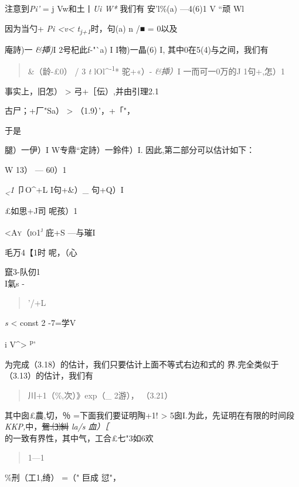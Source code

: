 \documentclass{article}
\begin{document}
注意到\emph{Pi'} = j Vw和土丨\emph{Ui W*} 我们有 安'{l\%(a) ---4(6)1} V
``顽 {Wl}

因为当勺+ \emph{Pi \textless{}v\textless{}
t\textsubscript{j+1}}时，句(a) n /■ = 0以及

庵詩)一 \emph{\&揷)}I 2号杞此f-"`a) I I物)一晶(6) I,
其中0在5(4)与之间，我们有

\begin{quote}
\textbar{}\&（龄-£0）\textbar{} / 3 \emph{t}
lOl\^{}\textsuperscript{-1}* 驼+«）- \emph{\&揷）}I
一而可一0万\textbar{}的J 1句+,怎）1
\end{quote}

事实上，旧怎）\textbar{} \textgreater{}
\textbar{}弓+［伝）\textbar{},并由引理2.1

\textbar{}古尸；+厂"Sa）\textbar{} \textgreater{} （1.9）'，+「"，

于是

\textbar{}腿）一伊）I W专鼎``定詩）一鈴件）I.
因此,第二部分可以估计如下：

W {13） --- 60）1}

\emph{\textsubscript{\textless{}}1} 卩O\^{}+L {I句+\&）\_ 句+Q）I}

£如思+J司 呢孩）1

\textsc{\textless{}Ay（io1\textsuperscript{j}} {庇+S ---与璀I}

毛万4【1时 呢，（心

{竄3-队仞1\\
}I氣s -

\begin{quote}
'/+L
\end{quote}

\emph{s} \textless{} const 2 -7=学V

i V\^{}\textgreater{} \textsuperscript{p}'

为完成（3.18）的估计，我们只要估计上面不等式右边和式的
界.完全类似于（3.13）的估计，我们有

\begin{quote}
\textbar{}川+1（\%,次）\textbar{}》exp（\_ 2游）， （3.21）
\end{quote}

其中囱£農,切，％ =下面我们要证明陶+1! \textgreater{}
5囱I.为此，先证明在有限的时间段 \emph{KKP,}中，\sout{鴛:⑶糾} \emph{la/s
血）［\\
}的一致有界性，其中气，工合£七"3如6欢

\begin{quote}
1---1
\end{quote}

{\textbar{}\%刑（工1,绮）\textbar{}} =（" {巨成 愆"，}
\end{document}
